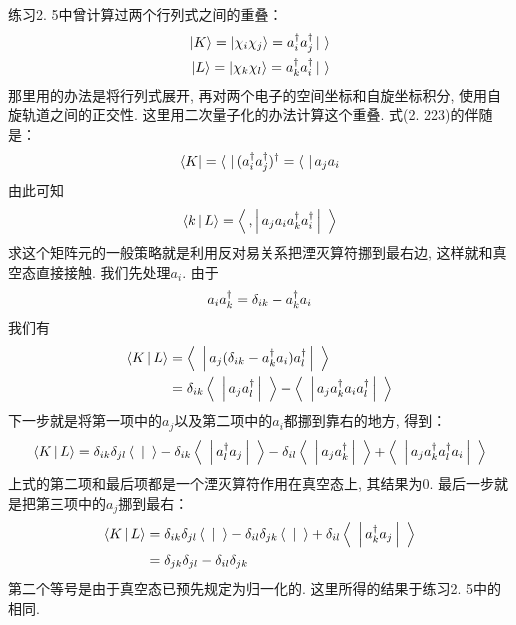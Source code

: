 练习2.
5中曾计算过两个行列式之间的重叠：
\begin{align}
\Ket{K} = \Ket{\chi_i\chi_j} = a^\dagger_ia^\dagger_j\Ket{\,\,}\\
\Ket{L} = \Ket{\chi_k\chi_l} = a^\dagger_ka^\dagger_i\Ket{\,\,}
\end{align}
那里用的办法是将行列式展开, 
再对两个电子的空间坐标和自旋坐标积分, 
使用自旋轨道之间的正交性. 
这里用二次量子化的办法计算这个重叠. 
式(2.
223)的伴随是：
\begin{align}
\Bra{K} = \Bra{\,\,}(a^\dagger_ia^\dagger_j)^\dagger = \Bra{\,\,}a_ja_i
\end{align}
由此可知
\begin{align}
\Braket{k|L} = \Braket{\,,|a_ja_ia^\dagger_ka^\dagger_i|\,\,}
\end{align}
求这个矩阵元的一般策略就是利用反对易关系把湮灭算符挪到最右边, 
这样就和真空态直接接触. 
我们先处理$a_i$. 
由于
\begin{align}
a_ia^\dagger_k = \delta_{ik} - a^\dagger_ka_i
\end{align}
我们有
\begin{align}
\Braket{K|L} & = \Braket{\,\,|a_j(\delta_{ik}-a^\dagger_ka_i)a^\dagger_l|\,\,}\\
             & = \delta_{ik}\Braket{\,\,|a_ja^\dagger_l|\,\,} - \Braket{\,\,|a_ja^\dagger_ka_ia^\dagger_l|\,\,}
\end{align}
下一步就是将第一项中的$a_j$以及第二项中的$a_i$都挪到靠右的地方, 
得到：
\begin{align}
\Braket{K|L} = \delta_{ik}\delta_{jl} \Braket{\,\,|\,\,} - \delta_{ik}\Braket{\,\,|a^\dagger_la_j|\,\,} - \delta_{il}\Braket{\,\,|a_ja^\dagger_k|\,\,} + \Braket{\,\,|a_ja^\dagger_ka^\dagger_la_i|\,\,}
\end{align}
上式的第二项和最后项都是一个湮灭算符作用在真空态上, 
其结果为$0$. 
最后一步就是把第三项中的$a_j$挪到最右：
\begin{align}
\Braket{K|L} & = \delta_{ik}\delta_{jl} \Braket{\,\,|\,\,} - \delta_{il}\delta_{jk}\Braket{\,\,|\,\,} + \delta_{il}\Braket{\,\,|a^\dagger_ka_j|\,\,}\notag\\
& = \delta_{jk}\delta_{jl} - \delta_{il}\delta_{jk}
\end{align}
第二个等号是由于真空态已预先规定为归一化的. 
这里所得的结果于练习2.
5中的相同. 

